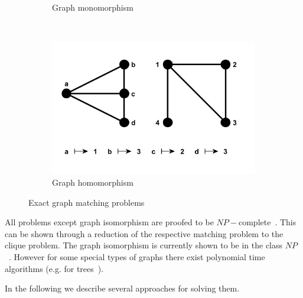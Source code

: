\begin{figure}[h!]
\begin{subfigure}[b]{0.3\textwidth}
        \caption{Graph monomorphism}
        \label{fig:monomorphism}
    \end{subfigure}
    ~
    \begin{subfigure}[b]{0.3\textwidth}
        \includegraphics[width=\textwidth]{chapter1/fig/homomorphism}
        \caption{Graph homomorphism}
        \label{fig:homomorphism}
    \end{subfigure}
    \caption[Exact graph matching problems]{Exact graph matching problems}\label{fig:Exact_GM}
\end{figure}

All problems except graph isomorphism are proofed to be $NP-$complete~\cite{Garey_NPComplet}. This can be shown through a reduction of the respective matching problem to the clique problem. The graph isomorphism is currently shown to be in the class $NP$~\cite{Garey_NPComplet,Schoening_GI}. However for some special types of graphs there exist polynomial time algorithms (e.g. for %
trees~\cite{Aho_Ullman, Garey_NPComplet}).

In the following we describe several approaches for solving them.
